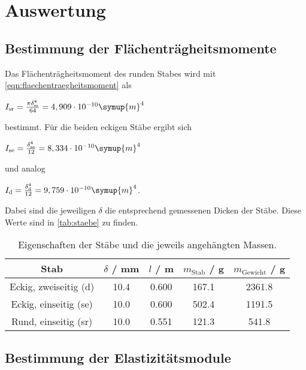 \section{Auswertung}
\label{sec:Auswertung}
\subsection{Bestimmung der Flächenträgheitsmomente}

Das Flächenträgheitsmoment des runden Stabes wird mit \eqref{eqn:flaechentraegheitsmoment} als

\vspace{.5em}
\centerline{$I_\text{sr} = \frac{\pi \delta_\text{sr}^4}{64} = 4,909 \cdot 10^{-10} \symup{m}^4$}
\vspace{.5em}

bestimmt. Für die beiden eckigen Stäbe ergibt sich 

\vspace{.5em}
\centerline{$I_\text{se} = \frac{\delta_\text{se}^4}{12} = 8,334 \cdot 10^{-10} \symup{m}^4$}
\vspace{.5em}

und analog

\vspace{.5em}
\centerline{$I_\text{d} = \frac{\delta_\text{d}^4}{12} = 9,759 \cdot 10^{-10} \symup{m}^4$.}
\vspace{.5em}

Dabei sind die jeweiligen $\delta$ die entsprechend gemessenen Dicken der Stäbe. Diese Werte sind in \autoref{tab:staebe} zu finden.

\begin{table}[!htp]
  \centering
  \caption{Eigenschaften der Stäbe und die jeweils angehängten Massen.}
  \label{tab:staebe}
  \begin{tabular}{c S[table-format=2.1] S[table-format=1.3] S[table-format=3.1] S[table-format=4.1]}
    \toprule
    {Stab} & {$\delta$ / mm} & {$l$ / m} & {$m_\text{Stab}$ / g} & {$m_\text{Gewicht}$ / g} \\
    \midrule
    Eckig, zweiseitig (d) & 10.4 & 0.600 & 167.1 & 2361.8 \\
    Eckig, einseitig (se) & 10.0 & 0.600 & 502.4 & 1191.5 \\
    Rund, einseitig (sr)  & 10.0 & 0.551 & 121.3 &  541.8 \\
    \bottomrule
  \end{tabular}
\end{table}

\subsection{Bestimmung der Elastizitätsmodule}

